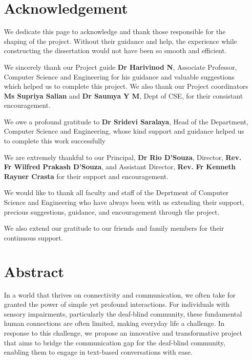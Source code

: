 \documentclass[12pt,a4paper]{report}
\begin{document}
{}
\chapter*{\centering Acknowledgement}
We dedicate this page to acknowledge and thank those responsible for the shaping of the project. Without their guidance and help, the experience while constructing the dissertation would not have been so smooth and efficient.
\par
\vspace{0.15in}
\noindent We sincerely thank our Project guide \textbf{Dr Harivinod N}, Associate Professor, Computer Science and Engineering for his guidance and valuable suggestions which helped us to complete this project. We also thank our Project coordinators \textbf{Ms Supriya Salian} and \textbf{Dr Saumya Y M},  Dept of CSE, for their consistant encouragement. 
\par
\vspace{0.15in}
\noindent We owe a profound gratitude to \textbf{Dr Sridevi Saralaya}, Head of the Department, Computer Science and Engineering, whose kind support and guidance helped us to complete this work successfully
\par
\vspace{0.15in}
\noindent We are extremely thankful to our Principal, \textbf{Dr Rio D’Souza}, Director,  \textbf{Rev. Fr Wilfred Prakash D'Souza}, and Assistant Director, \textbf{Rev. Fr Kenneth Rayner Crasta} for their support and encouragement.
\par
\vspace{0.15in}
\noindent We would like to thank all faculty and staff of the Deprtment of Computer Science and Engineering who have always been with us extending their support, precious suggestions, guidance, and encouragement through the project.
\par
\vspace{0.15in}
\noindent We also extend our gratitude to our friends and family members for their continuous support.


\pagestyle{plain}
\chapter*{\centering Abstract}
 In a world that thrives on connectivity and communication, we often take for granted
the power of simple yet profound interactions. For individuals with sensory impairments, particularly the deaf-blind community, these fundamental human connections are often limited, making everyday life a challenge. In response to this challenge, we propose an innovative and transformative project that aims to bridge the communication gap for the deaf-blind community, enabling them to engage in text-based conversations with ease.\\
\end{document}
